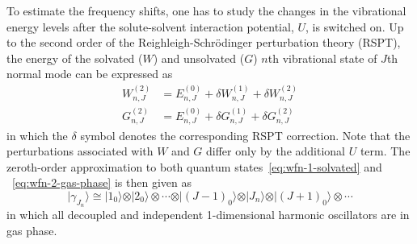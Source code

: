 \documentclass[b5paper,oneside,fleqn,11pt]{book}
\begin{document}
\begin{refsection}
To estimate the frequency shifts, one has to study the changes
in the vibrational energy levels after the solute\hyp{}solvent 
interaction potential, $U$, is switched on. Up to the second order
of the Reighleigh\hyp{}Schr{\"o}dinger perturbation theory (RSPT), 
the energy of the solvated ($W$) and unsolvated ($G$) 
$n$th vibrational state of $J$th normal mode can be expressed as
%
\begin{subequations}\label{e:gwlevels}
\begin{align}
W_{n,J}^{(2)} &= E_{n,J}^{(0)} + \delta W_{n,J}^{(1)} + \delta W_{n,J}^{(2)} \\
G_{n,J}^{(2)} &= E_{n,J}^{(0)} + \delta G_{n,J}^{(1)} + \delta G_{n,J}^{(2)}
\end{align}
\end{subequations}
%
in which the $\delta$ symbol denotes the corresponding RSPT correction. Note 
that the perturbations associated with $W$ and $G$ differ only by 
the additional $U$ term.
The zeroth\hyp{}order approximation
to both quantum states~\eqref{eq:wfn-1-solvated} and
~\eqref{eq:wfn-2-gas-phase}
is then given as
%
\begin{equation}  \label{eq:reference_state_vibr}
\vert \gamma_{J_n}   \rangle 
 \cong 
 \vert 1_0 \rangle \otimes 
 \vert 2_0 \rangle \otimes \cdots \otimes
 \vert (J-1)_0 \rangle \otimes
 \vert J_n \rangle \otimes 
 \vert (J+1)_0 \rangle \otimes \cdots 
\end{equation}
%
in which all decoupled and independent 1\hyp{}dimensional harmonic oscillators 
are in gas phase.


\end{refsection}
\end{document}
